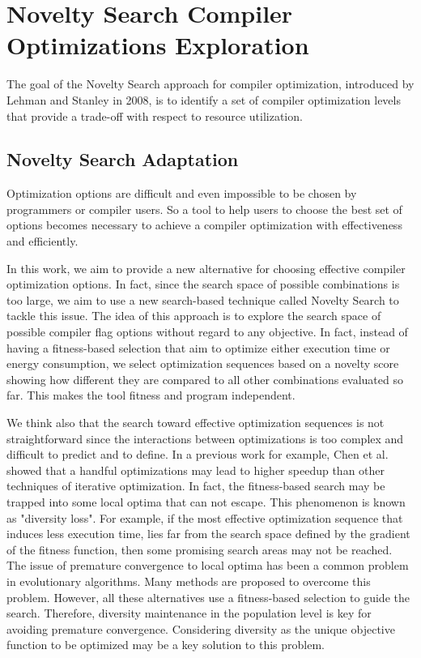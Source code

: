 \section{Novelty Search Compiler Optimizations Exploration}
 
The goal of the Novelty Search approach for compiler optimization, introduced by Lehman and Stanley in 2008\cite{lehman2008exploiting}, is to identify a set of compiler optimization levels that provide a trade-off with respect to resource utilization. 

\subsection{Novelty Search Adaptation}
Optimization options are difficult and even impossible to be chosen by programmers or compiler users. So a tool to help users to choose the best set of options becomes necessary to achieve a compiler optimization with effectiveness and efficiently. 

In this work, we aim to provide a new alternative for choosing effective compiler optimization options. In fact, since the search space of possible combinations is too large, we aim to use a new search-based technique called Novelty Search to tackle this issue. The idea of this approach is to explore the search space of possible compiler flag options without regard to any objective. In fact, instead of having a fitness-based selection that aim to optimize either execution time or energy consumption, we select optimization sequences based on a novelty score showing how different they are compared to all other combinations evaluated so far. This makes the tool fitness and program independent.

We think also that the search toward effective optimization sequences is not straightforward since the interactions between optimizations is too complex and difficult to predict and to define. In a previous work for example, Chen et al. \cite{chen2012deconstructing}showed that a handful optimizations may lead to higher speedup than other techniques of iterative optimization. In fact, the fitness-based search may be trapped into some local optima that can not escape. This phenomenon is known as "diversity loss". For example, if the most effective optimization sequence that induces less execution time, lies far from the search space defined by the gradient of the fitness function, then some promising search areas may not be reached. The issue of premature convergence to local optima has been a common problem in evolutionary algorithms. Many methods are proposed to overcome this
problem\cite{banzhaf1996effect,gathercole1996adverse}. However, all these alternatives use a fitness-based selection to guide the search. 
Therefore, diversity maintenance in the population level is key for avoiding premature convergence. Considering diversity as the unique objective function to be optimized may be a key solution to this problem.

